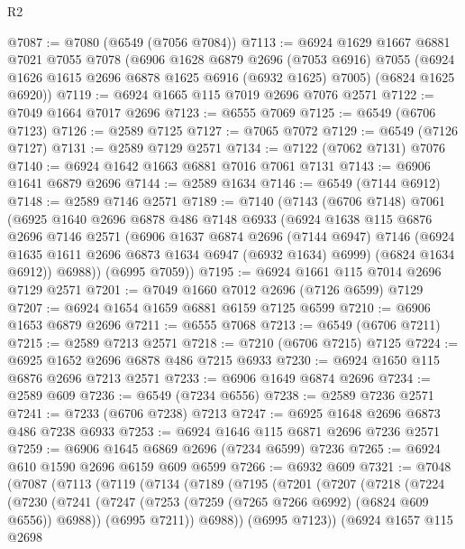 \begin{lexlean}{R2}
\begin{coremodule}
@7087 := @7080 (@6549 (@7056 @7084))
@7113 := @6924
    @1629
    @1667
    @6881
    @7021
    @7055
    @7078
    (@6906
      @1628
      @6879
      @2696
      (@7053 @6916)
      @7055
      (@6924 @1626 @1615 @2696 @6878 @1625 @6916 (@6932 @1625) @7005)
      (@6824 @1625 @6920))
@7119 := @6924 @1665 @115 @7019 @2696 @7076 @2571
@7122 := @7049 @1664 @7017 @2696
@7123 := @6555 @7069
@7125 := @6549 (@6706 @7123)
@7126 := @2589 @7125
@7127 := @7065 @7072
@7129 := @6549 (@7126 @7127)
@7131 := @2589 @7129 @2571
@7134 := @7122 (@7062 @7131) @7076
@7140 := @6924 @1642 @1663 @6881 @7016 @7061 @7131
@7143 := @6906 @1641 @6879 @2696
@7144 := @2589 @1634
@7146 := @6549 (@7144 @6912)
@7148 := @2589 @7146 @2571
@7189 := @7140
    (@7143
      (@6706 @7148)
      @7061
      (@6925
        @1640
        @2696
        @6878
        @486
        @7148
        @6933
        (@6924
          @1638
          @115
          @6876
          @2696
          @7146
          @2571
          (@6906
            @1637
            @6874
            @2696
            (@7144 @6947)
            @7146
            (@6924 @1635 @1611 @2696 @6873 @1634 @6947 (@6932 @1634) @6999)
            (@6824 @1634 @6912))
          @6988))
      (@6995 @7059))
@7195 := @6924 @1661 @115 @7014 @2696 @7129 @2571
@7201 := @7049 @1660 @7012 @2696 (@7126 @6599) @7129
@7207 := @6924 @1654 @1659 @6881 @6159 @7125 @6599
@7210 := @6906 @1653 @6879 @2696
@7211 := @6555 @7068
@7213 := @6549 (@6706 @7211)
@7215 := @2589 @7213 @2571
@7218 := @7210 (@6706 @7215) @7125
@7224 := @6925 @1652 @2696 @6878 @486 @7215 @6933
@7230 := @6924 @1650 @115 @6876 @2696 @7213 @2571
@7233 := @6906 @1649 @6874 @2696
@7234 := @2589 @609
@7236 := @6549 (@7234 @6556)
@7238 := @2589 @7236 @2571
@7241 := @7233 (@6706 @7238) @7213
@7247 := @6925 @1648 @2696 @6873 @486 @7238 @6933
@7253 := @6924 @1646 @115 @6871 @2696 @7236 @2571
@7259 := @6906 @1645 @6869 @2696 (@7234 @6599) @7236
@7265 := @6924 @610 @1590 @2696 @6159 @609 @6599
@7266 := @6932 @609
@7321 := @7048
    (@7087
      (@7113
        (@7119
          (@7134
            (@7189
              (@7195
                (@7201
                  (@7207
                    (@7218
                      (@7224
                        (@7230
                          (@7241
                            (@7247 (@7253 (@7259 (@7265 @7266 @6992) (@6824 @609 @6556)) @6988))
                            (@6995 @7211))
                          @6988))
                      (@6995 @7123))
                    (@6924
                      @1657
                      @115
                      @2698

\end{coremodule}
\end{lexlean}
